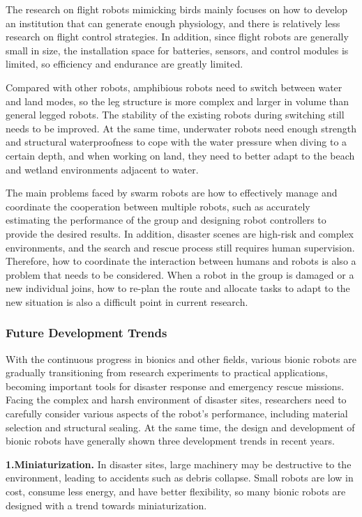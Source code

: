 \documentclass[conference]{IEEEtran}
\begin{document}
The research on flight robots mimicking birds mainly focuses on how to develop an institution that can generate enough physiology\cite{b52}, and there is relatively less research on flight control strategies. In addition, since flight robots are generally small in size, the installation space for batteries, sensors, and control modules is limited, so efficiency and endurance are greatly limited.

Compared with other robots, amphibious robots need to switch between water and land modes, so the leg structure is more complex and larger in volume than general legged robots\cite{b53}. The stability of the existing robots during switching still needs to be improved. At the same time, underwater robots need enough strength and structural waterproofness to cope with the water pressure when diving to a certain depth, and when working on land, they need to better adapt to the beach and wetland environments adjacent to water.

The main problems faced by swarm robots are how to effectively manage and coordinate the cooperation between multiple robots, such as accurately estimating the performance of the group and designing robot controllers to provide the desired results. In addition, disaster scenes are high-risk and complex environments, and the search and rescue process still requires human supervision\cite{b54}. Therefore, how to coordinate the interaction between humans and robots is also a problem that needs to be considered. When a robot in the group is damaged or a new individual joins, how to re-plan the route and allocate tasks to adapt to the new situation is also a difficult point in current research.

\subsubsection{Future Development Trends}
With the continuous progress in bionics and other fields, various bionic robots are gradually transitioning from research experiments to practical applications, becoming important tools for disaster response and emergency rescue missions. Facing the complex and harsh environment of disaster sites, researchers need to carefully consider various aspects of the robot's performance, including material selection and structural sealing. At the same time, the design and development of bionic robots have generally shown three development trends in recent years.

\textbf{1.Miniaturization.} In disaster sites, large machinery may be destructive to the environment, leading to accidents such as debris collapse. Small robots are low in cost, consume less energy, and have better flexibility, so many bionic robots are designed with a trend towards miniaturization.
\end{document}
